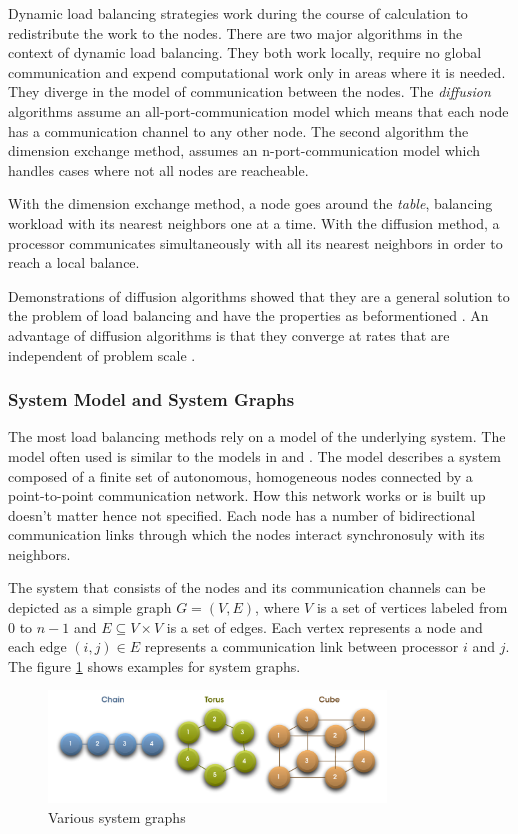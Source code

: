 \documentclass[DIV10, abstracton, openright, footsepline, headsepline, twoside, 9pt,
bigheadings]{scrreprt}
\begin{document}
Dynamic load balancing strategies work during the course of calculation to
redistribute the work to the nodes. There are two major algorithms in the
context of dynamic load balancing. They both work locally, require no global
communication and expend computational work only in areas where it is needed.
They diverge in the model of communication between the nodes. The
\textit{diffusion} algorithms assume an all-port-communication model which
 means that each node has a communication channel to any other node. The second
 algorithm the
dimension exchange method, assumes an n-port-communication model which handles
cases where not all nodes are reacheable.

With the dimension exchange method, a node goes around the \textit{table},
balancing workload with its nearest neighbors one at a time. With the diffusion
method, a processor communicates simultaneously with all its nearest neighbors
in order to reach a local balance.

Demonstrations of diffusion algorithms showed that they are a general solution
to the problem of load balancing and have the properties as beformentioned
\cite{Cybenko89} \cite{Dijkstra80}. An advantage of diffusion algorithms is
that they converge at rates that are independent of problem scale
\cite{Heirich95} \cite{Heirich97}.

\subsubsection*{System Model and System Graphs}
The most load balancing methods rely on a model of the underlying system. The
model often used is similar to the models in \cite{Cybenko89} and
\cite{Hosseini90}. The model describes a system composed of a finite set of
autonomous, homogeneous nodes connected by a point-to-point communication
network. How this network works or is built up doesn't matter hence not
specified. Each node has a number of bidirectional communication links
through which the nodes interact synchronosuly with its neighbors.

The system that consists of the nodes and its communication channels
can be depicted as a simple graph $G = (V, E)$, where $V$ is a set of vertices
labeled from $0$ to $n-1$  and $E \subseteq V \times V$ is a set of edges.
Each vertex represents a node and each edge $(i, j) \in E$ represents a
communication link between processor $i$ and $j$. The figure \ref{fig:system_graphs}
shows examples for system graphs.

\begin{figure}[H]
\centering
\includegraphics[width=0.8\textwidth]{diagramme/system_graphs}
\caption{Various system graphs}
\label{fig:system_graphs}
\end{figure}
\end{document}
